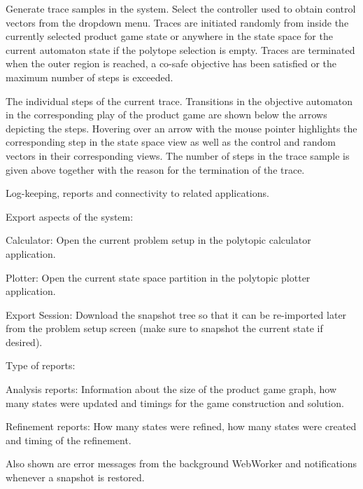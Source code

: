     \startsubsubject[title={Widget: Sample Trace}]

        Generate trace samples in the system.
        Select the controller used to obtain control vectors from the dropdown menu.
        Traces are initiated randomly from inside the currently selected product game state or anywhere in the state space for the current automaton state if the polytope selection is empty.
        Traces are terminated when the outer region is reached, a co-safe objective has been satisfied or the maximum number of steps is exceeded.

    \stopsubsubject

    \startsubsubject[title={Widget: Trace}]

        The individual steps of the current trace.
        Transitions in the objective automaton in the corresponding play of the product game are shown below the arrows depicting the steps.
        Hovering over an arrow with the mouse pointer highlights the corresponding step in the state space view as well as the control and random vectors in their corresponding views.
        The number of steps in the trace sample is given above together with the reason for the termination of the trace.

    \stopsubsubject

\stopsubject


\startsubject[title=Info Widgets]

    Log-keeping, reports and connectivity to related applications.

    \startsubsubject[title={Widget: Connectivity}]

        Export aspects of the system:

        \startitemize[packed]
            \item{Calculator: Open the current problem setup in the polytopic calculator application.}
            \item{Plotter: Open the current state space partition in the polytopic plotter application.}
            \item{Export Session: Download the snapshot tree so that it can be re-imported later from the problem setup screen (make sure to snapshot the current state if desired).}
        \stopitemize

    \stopsubsubject

    \startsubsubject[title={Widget: Log Messages}]

        Type of reports:

        \startitemize[packed]
            \item{Analysis reports: Information about the size of the product game graph, how many states were updated and timings for the game construction and solution.}
            \item{Refinement reports: How many states were refined, how many states were created and timing of the refinement.}
        \stopitemize

        Also shown are error messages from the background WebWorker and notifications whenever a snapshot is restored.

    \stopsubsubject

\stopsubject



